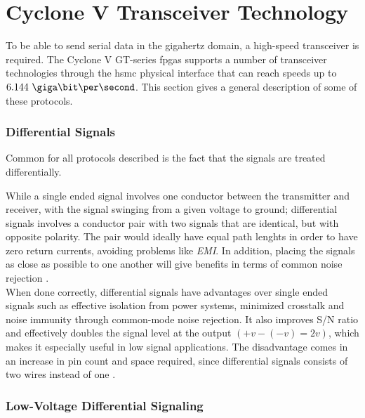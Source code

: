 \documentclass[main.tex]{subfiles}
\begin{document}

\chapter{Cyclone V Transceiver Technology}

To be able to send serial data in the gigahertz domain, a high-speed transceiver is required. The Cyclone V GT-series \glspl{fpga} supports a number of transceiver technologies through the \gls{hsmc} physical interface that can reach speeds up to $6.144\ \giga\bit\per\second$. This section gives a general description of some of these protocols.

\subsection{Differential Signals} \label{subsec:diffsig}

Common for all protocols described is the fact that the signals are treated differentially. 

While a single ended signal involves one conductor between the transmitter and receiver, with the signal swinging from a given voltage to ground; differential signals involves a conductor pair with two signals that are identical, but with opposite polarity. The pair would ideally have equal path lenghts in order to have zero return currents, avoiding problems like \textit{EMI}. In addition, placing the signals as close as possible to one another will give benefits in terms of common noise rejection \cite{douglas01}.\\

When done correctly, differential signals have advantages over single ended signals such as effective isolation from power systems, minimized crosstalk and noise immunity through common-mode noise rejection. It also improves S/N ratio and effectively doubles the signal level at the output $(+v - (-v) = 2v)$, which makes it especially useful in low signal applications. The disadvantage comes in an increase in pin count and space required, since differential signals consists of two wires instead of one \cite{douglas01}.

\subsection{Low-Voltage Differential Signaling} \label{sec:lvds}
\end{document}
